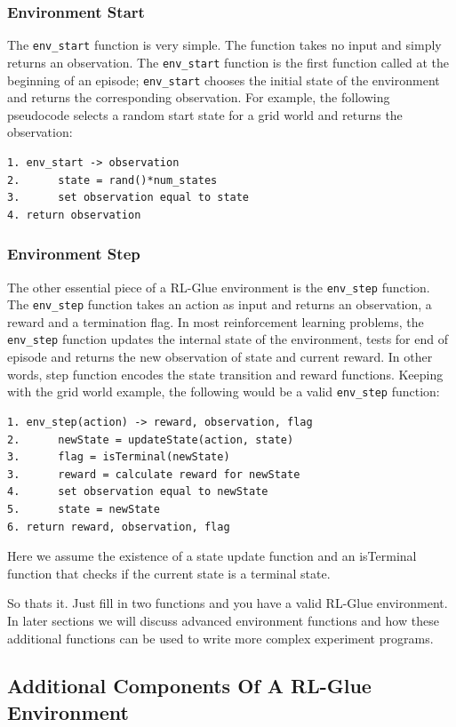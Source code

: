 \documentclass[11pt]{article}
\begin{document}
\subsubsection{Environment Start}
The \texttt{env\_start} function is very simple. The function takes no input and simply returns an observation. The \texttt{env\_start} function is the first function called at the beginning of an episode; \texttt{env\_start} chooses the initial state of the environment and returns the corresponding observation. For example, the following pseudocode selects a random start state for a grid world and returns the observation:
\begin{verbatim}
1. env_start -> observation
2.      state = rand()*num_states
3.      set observation equal to state
4. return observation
\end{verbatim}


\subsubsection{Environment Step}
The other essential piece of a RL-Glue environment is the \texttt{env\_step} function. The \texttt{env\_step} function takes an action as input and returns an observation, a reward and a termination flag. In most reinforcement learning problems, the  \texttt{env\_step} function updates the internal state of the environment, tests for end of episode and returns the new observation of state and current reward. In other words, step function encodes the state transition and reward functions. Keeping with the grid world example, the following would be a valid \texttt{env\_step} function:
\begin{verbatim}
1. env_step(action) -> reward, observation, flag 
2.      newState = updateState(action, state)
3.      flag = isTerminal(newState)
3.      reward = calculate reward for newState
4.      set observation equal to newState
5.      state = newState
6. return reward, observation, flag
\end{verbatim}
Here we assume the existence of a state update function and an isTerminal function that checks if the current state is a terminal state.

So thats it. Just fill in two functions and you have a valid RL-Glue environment. In later sections we will discuss advanced environment functions and how these additional functions can be used to write more complex experiment programs. 

\subsection{Additional Components Of A RL-Glue Environment}
\label{envp2}
\end{document}
